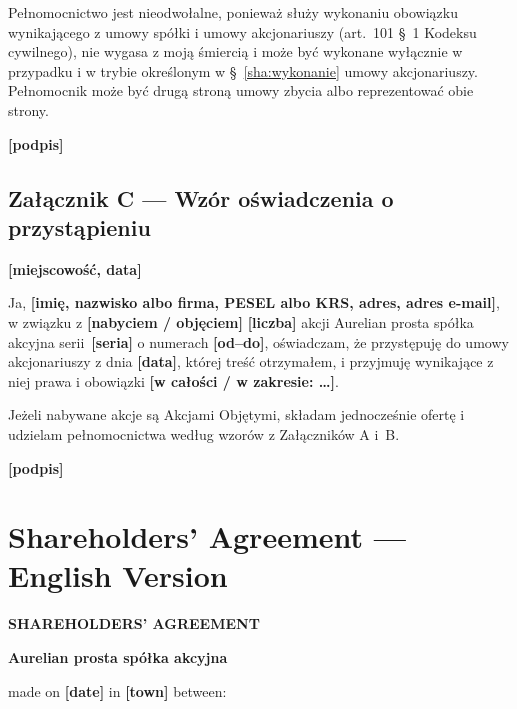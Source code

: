 \documentclass[12pt,a4paper]{report}
\newcounter{paragraf}
\newcommand{\field}[1]{\textbf{[#1]}}
\newcommand{\CompanyFull}{Aurelian prosta spółka akcyjna}
\begin{document}
Pełnomocnictwo jest nieodwołalne, ponieważ służy wykonaniu obowiązku wynikającego z umowy spółki i umowy akcjonariuszy (art.~101 §~1 Kodeksu cywilnego), nie wygasa z moją śmiercią i może być wykonane wyłącznie w przypadku i w trybie określonym w §~\ref{sha:wykonanie} umowy akcjonariuszy. Pełnomocnik może być drugą stroną umowy zbycia albo reprezentować obie strony.

\field{podpis}

\newpage
\section*{Załącznik C --- Wzór oświadczenia o przystąpieniu}

\field{miejscowość, data}

Ja, \field{imię, nazwisko albo firma, PESEL albo KRS, adres, adres e-mail}, w związku z \field{nabyciem / objęciem} \field{liczba} akcji \CompanyFull{} serii~\field{seria} o numerach \field{od--do}, oświadczam, że przystępuję do umowy akcjonariuszy z dnia \field{data}, której treść otrzymałem, i przyjmuję wynikające z niej prawa i obowiązki \field{w całości / w zakresie: \ldots}.

Jeżeli nabywane akcje są Akcjami Objętymi, składam jednocześnie ofertę i udzielam pełnomocnictwa według wzorów z Załączników A i~B.

\field{podpis}


\newpage
{}
\setcounter{paragraf}{0}

\chapter*{Shareholders' Agreement --- English Version}

\begin{center}
{\Large\bfseries SHAREHOLDERS' AGREEMENT}\par
\vspace{0.25cm}
{\LARGE\bfseries \CompanyFull}\par
\vspace{0.6cm}
\end{center}

made on \field{date} in \field{town} between:
\end{document}
